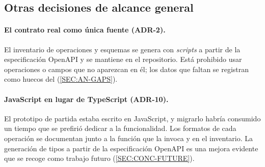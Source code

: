 \subsection{Otras decisiones de alcance general}

\paragraph{El contrato real como única fuente (ADR-2).} El inventario de operaciones y
esquemas se genera con \textit{scripts} a partir de la especificación OpenAPI y se mantiene
en el repositorio. Está prohibido usar operaciones o campos que no aparezcan en él; los
datos que faltan se registran como huecos del  (\cref{SEC:AN-GAPS}).

\paragraph{JavaScript en lugar de TypeScript (ADR-10).} El prototipo de partida estaba
escrito en JavaScript, y migrarlo habría consumido un tiempo que se prefirió dedicar a la
funcionalidad. Los formatos de cada operación se documentan junto a la función que la
invoca y en el inventario. La generación de tipos a partir de la especificación OpenAPI es
una mejora evidente que se recoge como trabajo futuro (\cref{SEC:CONC-FUTURE}).
